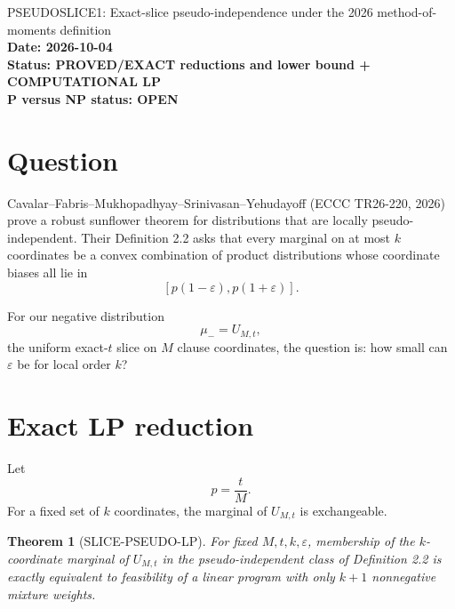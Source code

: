 \documentclass[11pt]{article}
\newtheorem{theorem}{Theorem}
\begin{document}
\begin{center}
{\Large PSEUDOSLICE1: Exact-slice pseudo-independence under the 2026 method-of-moments definition}\\[4pt]
\textbf{Date: 2026-10-04}\\
\textbf{Status: PROVED/EXACT reductions and lower bound + COMPUTATIONAL LP}\\
\textbf{P versus NP status: OPEN}
\end{center}

\section{Question}

Cavalar--Fabris--Mukhopadhyay--Srinivasan--Yehudayoff (ECCC TR26-220, 2026)
prove a robust sunflower theorem for distributions that are locally
pseudo-independent. Their Definition 2.2 asks that every marginal on at most
\(k\) coordinates be a convex combination of product distributions whose
coordinate biases all lie in
\[
[p(1-\varepsilon),p(1+\varepsilon)].
\]

For our negative distribution
\[
\mu_- = U_{M,t},
\]
the uniform exact-\(t\) slice on \(M\) clause coordinates, the question is:
how small can \(\varepsilon\) be for local order \(k\)?

\section{Exact LP reduction}

Let
\[
p=\frac tM.
\]
For a fixed set of \(k\) coordinates, the marginal of \(U_{M,t}\) is
exchangeable.

\begin{theorem}[SLICE-PSEUDO-LP]
For fixed \(M,t,k,\varepsilon\), membership of the \(k\)-coordinate marginal
of \(U_{M,t}\) in the pseudo-independent class of Definition 2.2 is exactly
equivalent to feasibility of a linear program with only \(k+1\) nonnegative
mixture weights.
\end{theorem}
\end{document}
